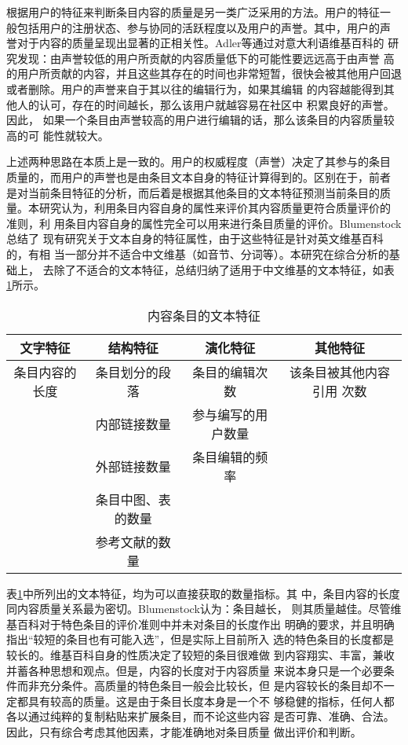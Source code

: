 根据用户的特征来判断条目内容的质量是另一类广泛采用的方法。用户的特征一
般包括用户的注册状态、参与协同的活跃程度以及用户的声誉。其中，用户的声
誉对于内容的质量呈现出显著的正相关性。Adler等通过对意大利语维基百科的
研究发现：由声誉较低的用户所贡献的内容质量低下的可能性要远远高于由声誉
高的用户所贡献的内容，并且这些其存在的时间也非常短暂，很快会被其他用户回退
或者删除\cite{Adler2008}。用户的声誉来自于其以往的编辑行为，如果其编辑
的内容越能得到其他人的认可，存在的时间越长，那么该用户就越容易在社区中
积累良好的声誉。因此，
如果一个条目由声誉较高的用户进行编辑的话，那么该条目的内容质量较高的可
能性就较大。

上述两种思路在本质上是一致的。用户的权威程度（声誉）决定了其参与的条目
质量的，而用户的声誉也是由条目文本自身的特征计算得到的。区别在于，前者
是对当前条目特征的分析，而后着是根据其他条目的文本特征预测当前条目的质
量。本研究认为，利用条目内容自身的属性来评价其内容质量更符合质量评价的
准则，利
用条目内容自身的属性完全可以用来进行条目质量的评价。Blumenstock总结了
现有研究关于文本自身的特征属性，由于这些特征是针对英文维基百科的，有相
当一部分并不适合中文维基（如音节、分词等）。本研究在综合分析的基础上，
去除了不适合的文本特征，总结归纳了适用于中文维基的文本特征，如表
\ref{text-feature}所示。
\begin{table}[!htb]
  \centering
\small
\caption{\small{内容条目的文本特征}} 
 \begin{tabular}{|c|c|c|c|}
 \hline
    文字特征&结构特征&演化特征&其他特征\\\hline
    条目内容的长度&条目划分的段落&条目的编辑次数&该条目被其他内容引用
    次数\\
 &内部链接数量&参与编写的用户数量&\\
 &外部链接数量&条目编辑的频率& \\
 &条目中图、表的数量& &\\
  &参考文献的数量&& \\\hline
  \end{tabular}
  
  \label{text-feature}
\end{table}

表\ref{text-feature}中所列出的文本特征，均为可以直接获取的数量指标。其
中，条目内容的长度同内容质量关系最为密切。Blumenstock认为：条目越长，
则其质量越佳。尽管维基百科对于特色条目的评价准则中并未对条目的长度作出
明确的要求，并且明确指出“较短的条目也有可能入选”，但是实际上目前所入
选的特色条目的长度都是较长的。维基百科自身的性质决定了较短的条目很难做
到内容翔实、丰富，兼收并蓄各种思想和观点。但是，内容的长度对于内容质量
来说本身只是一个必要条件而非充分条件。高质量的特色条目一般会比较长，但
是内容较长的条目却不一定都具有较高的质量。这是由于条目长度本身是一个不
够稳健的指标，任何人都各以通过纯粹的复制粘贴来扩展条目，而不论这些内容
是否可靠、准确、合法。因此，只有综合考虑其他因素，才能准确地对条目质量
做出评价和判断。

